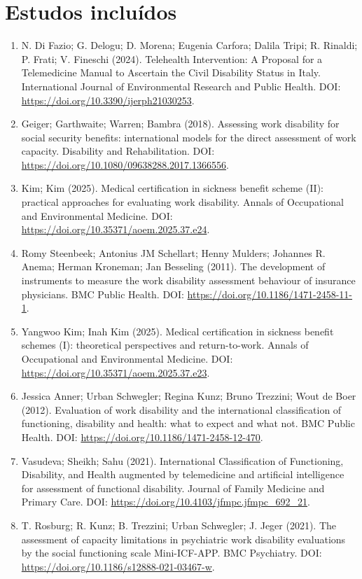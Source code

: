 \documentclass[12pt,a4paper]{article}
\begin{document}
\section{Estudos incluídos}
\label{sec:org6ef67f4}
\begin{enumerate}
\item N. Di Fazio; G. Delogu; D. Morena; Eugenia Carfora; Dalila Tripi; R. Rinaldi; P. Frati; V. Fineschi (2024). Telehealth Intervention: A Proposal for a Telemedicine Manual to Ascertain the Civil Disability Status in Italy. International Journal of Environmental Research and Public Health. DOI: \url{https://doi.org/10.3390/ijerph21030253}.
\item Geiger; Garthwaite; Warren; Bambra (2018). Assessing work disability for social security benefits: international models for the direct assessment of work capacity. Disability and Rehabilitation. DOI: \url{https://doi.org/10.1080/09638288.2017.1366556}.
\item Kim; Kim (2025). Medical certification in sickness benefit scheme (II): practical approaches for evaluating work disability. Annals of Occupational and Environmental Medicine. DOI: \url{https://doi.org/10.35371/aoem.2025.37.e24}.
\item Romy Steenbeek; Antonius JM Schellart; Henny Mulders; Johannes R. Anema; Herman Kroneman; Jan Besseling (2011). The development of instruments to measure the work disability assessment behaviour of insurance physicians. BMC Public Health. DOI: \url{https://doi.org/10.1186/1471-2458-11-1}.
\item Yangwoo Kim; Inah Kim (2025). Medical certification in sickness benefit schemes (I): theoretical perspectives and return-to-work. Annals of Occupational and Environmental Medicine. DOI: \url{https://doi.org/10.35371/aoem.2025.37.e23}.
\item Jessica Anner; Urban Schwegler; Regina Kunz; Bruno Trezzini; Wout de Boer (2012). Evaluation of work disability and the international classification of functioning, disability and health: what to expect and what not. BMC Public Health. DOI: \url{https://doi.org/10.1186/1471-2458-12-470}.
\item Vasudeva; Sheikh; Sahu (2021). International Classification of Functioning, Disability, and Health augmented by telemedicine and artificial intelligence for assessment of functional disability. Journal of Family Medicine and Primary Care. DOI: \url{https://doi.org/10.4103/jfmpc.jfmpc\_692\_21}.
\item T. Rosburg; R. Kunz; B. Trezzini; Urban Schwegler; J. Jeger (2021). The assessment of capacity limitations in psychiatric work disability evaluations by the social functioning scale Mini-ICF-APP. BMC Psychiatry. DOI: \url{https://doi.org/10.1186/s12888-021-03467-w}.

\end{enumerate}
\end{document}
